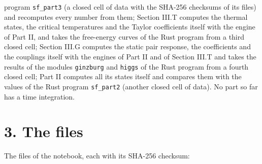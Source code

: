 \documentclass[
  10pt,
]{article}
\begin{document}
program \texttt{sf\_part3} (a closed cell of data with the SHA-256
checksums of its files) and recomputes every number from them; Section
III.T computes the thermal states, the critical temperatures and the
Taylor coefficients itself with the engine of Part II, and takes the
free-energy curves of the Rust program from a third closed cell; Section
III.G computes the static pair response, the coefficients and the
couplings itself with the engines of Part II and of Section III.T and
takes the results of the modules \texttt{ginzburg} and \texttt{higgs} of
the Rust program from a fourth closed cell; Part II computes all its
states itself and compares them with the values of the Rust program
\texttt{sf\_part2} (another closed cell of data). No part so far has a
time integration.

\hypertarget{the-files}{%
\section{3. The files}\label{the-files}}

The files of the notebook, each with its SHA-256 checksum:
\end{document}
